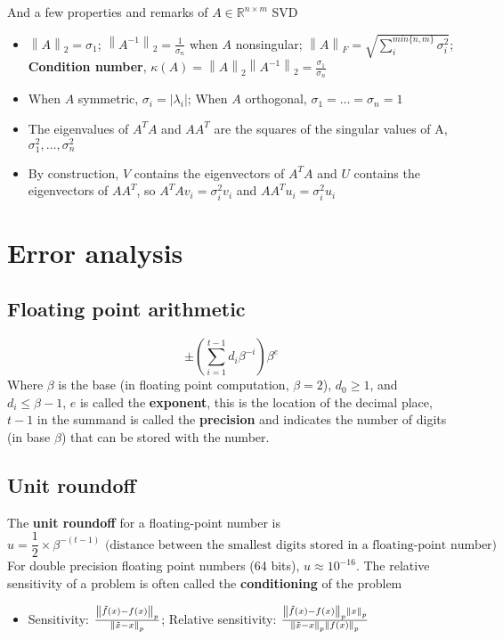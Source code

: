 \documentclass{article}
\newcommand{\norm}[2]{\left\lVert#1\right\rVert_#2}
\newcommand{\abs}[1]{\lvert#1\rvert}
\begin{document}
And a few properties and remarks of $A \in \mathbb{R}^{n\times m}$ SVD
\begin{itemize}
    \item $\norm{A}{2} = \sigma_1$; $\norm{A^{-1}}{2} = \frac{1}{\sigma_n}$ when $A$ nonsingular; $\norm{A}{F} = \sqrt{\sum_i^{min\{n,m\}}\sigma_i^2}$; \textbf{Condition number}, $\kappa(A) = \norm{A}{2}\norm{A^{-1}}{2} = \frac{\sigma_1}{\sigma_n}$
    \item When $A$ symmetric, $\sigma_i = \abs{\lambda_i}$; When $A$ orthogonal, $\sigma_1 = \dots = \sigma_n = 1$
    \item The eigenvalues of $A^TA$ and $AA^T$ are the squares of the singular values of A, $\sigma_1^2, \dots, \sigma_n^2$
    \item By construction, $V$ contains the eigenvectors of $A^TA$ and $U$ contains the eigenvectors of $AA^T$, so $A^TAv_i = \sigma_i^2v_i$ and $AA^Tu_i = \sigma_i^2u_i$
\end{itemize}

\section{Error analysis}
\subsection{Floating point arithmetic}
\begin{equation*}
    \pm (\sum_{i=1}^{t-1} d_i\beta^{-i})\beta^e
\end{equation*}
Where $\beta$ is the base (in floating point computation, $\beta=2$), $d_0\geq1$, and $d_i\leq \beta - 1$, $e$ is called the \textbf{exponent}, this is the location of the decimal place, $t-1$ in the summand is called the \textbf{precision} and indicates the number of digits (in base $\beta$) that can be stored with the number.


\subsection{Unit roundoff}
The \textbf{unit roundoff} for a floating-point number is 
\begin{equation*}
    u = \frac{1}{2} \times \beta^{-(t-1)} \textrm{ (distance between the smallest digits stored in a floating-point number)}
\end{equation*}
For double precision floating point numbers (64 bits), $u \approx 10^{-16}$. The relative sensitivity of a problem is often called the \textbf{conditioning} of the problem
\begin{itemize}
    \item Sensitivity: $\frac{\norm{\Tilde{f}(x) - f(x)}{p}}{\norm{\Tilde{x} - x}{p}}$; Relative sensitivity: $\frac{\norm{\Tilde{f}(x) - f(x)}{p}\norm{x}{p}}{\norm{\Tilde{x} - x}{p}\norm{f(x)}{p}}$
\end{itemize}
\end{document}
